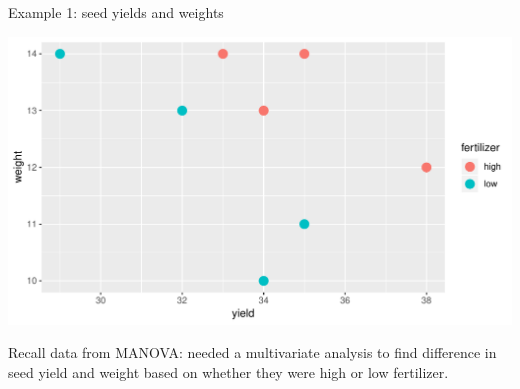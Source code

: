 \begin{frame}[fragile]{Example 1: seed yields and weights}



  {\small
\begin{minipage}[t]{0.55\linewidth}
\begin{knitrout}
\color{fgcolor}\begin{kframe}
\begin{alltt}
\hlkwb{=}\hlstd{(}\hlstd{,}
\hlstd{(}\hlopt{+}
  \hlstd{(}\hlstd{=}\hlstd{)}
\end{alltt}
\end{kframe}
\includegraphics[width=\maxwidth]{figure/berzani-1} 

\end{knitrout}
\end{minipage}
}
\begin{minipage}[t]{0.37\linewidth}
  \vspace{1in}
  Recall data from MANOVA: needed a multivariate analysis to find
  difference in seed yield and weight based on whether they were high
  or low fertilizer.
  
\end{minipage}

  
\end{frame}



